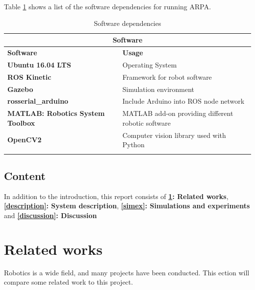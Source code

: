 \documentclass[11pt,a4paper, titlepage]{article}
\begin{document}
Table \ref{software} shows a list of the software dependencies for running ARPA.

\newpage

	\begin{center}           
    \begin{longtable}{| l | l |}
              \hline
\multicolumn{2}{|c|}{\textbf{Software}} \\ \hline \endhead
\textbf{Software} & \textbf{Usage} \\ \hline             
              \textbf{Ubuntu 16.04 LTS} & Operating System \\ \hline
              
              \textbf{ROS Kinetic} & Framework for robot software \\ \hline
              
              \textbf{Gazebo} & Simulation environment \\  \hline
             
              \textbf{rosserial\_arduino} & Include Arduino into ROS node network \\ \hline
              
              \textbf{MATLAB: Robotics System Toolbox} & MATLAB add-on providing different robotic software \\ \hline
              
              \textbf{OpenCV2} & Computer vision library used with Python \\  \hline

\caption{Software dependencies}
\label{software}                                       
\end{longtable}
\end{center}     

\subsection{Content}
In addition to the introduction, this report consists of \textbf{\ref{relwork}: Related works}, \textbf{\ref{description}: System description}, \textbf{\ref{simex}: Simulations and experiments} and \textbf{\ref{discussion}: Discussion}

\section{Related works}
\label{relwork}
Robotics is a wide field, and many projects have been conducted. This ection will compare some related work to this project.
\end{document}
